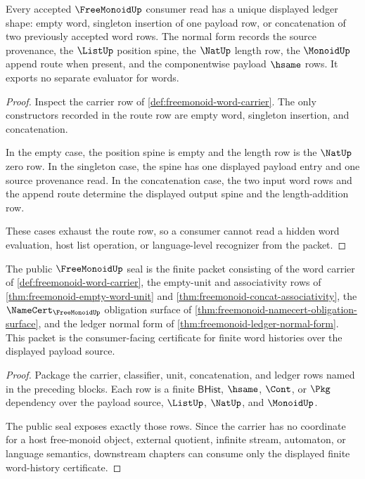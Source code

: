 \begin{theorem}
\label{thm:freemonoid-ledger-normal-form}
Every accepted $\FreeMonoidUp$ consumer read has a unique displayed ledger
shape: empty word, singleton insertion of one payload row, or concatenation of
two previously accepted word rows. The normal form records the source
provenance, the $\ListUp$ position spine, the $\NatUp$ length row, the
$\MonoidUp$ append route when present, and the componentwise payload
$\hsame$ rows. It exports no separate evaluator for words.
\end{theorem}
\begin{proof}
Inspect the carrier row of
\autoref{def:freemonoid-word-carrier}. The only constructors recorded in the
route row are empty word, singleton insertion, and concatenation.

In the empty case, the position spine is empty and the length row is the
$\NatUp$ zero row. In the singleton case, the spine has one displayed payload
entry and one source provenance read. In the concatenation case, the two input
word rows and the append route determine the displayed output spine and the
length-addition row.

These cases exhaust the route row, so a consumer cannot read a hidden word
evaluation, host list operation, or language-level recognizer from the packet.
\end{proof}

\begin{theorem}
\label{thm:freemonoid-public-seal}
The public $\FreeMonoidUp$ seal is the finite packet consisting of the word
carrier of \autoref{def:freemonoid-word-carrier}, the empty-unit and
associativity rows of \autoref{thm:freemonoid-empty-word-unit} and
\autoref{thm:freemonoid-concat-associativity}, the
$\NameCert_{\FreeMonoidUp}$ obligation surface of
\autoref{thm:freemonoid-namecert-obligation-surface}, and the ledger normal
form of \autoref{thm:freemonoid-ledger-normal-form}. This packet is the
consumer-facing certificate for finite word histories over the displayed
payload source.
\end{theorem}
\begin{proof}
Package the carrier, classifier, unit, concatenation, and ledger rows named in
the preceding blocks. Each row is a finite $\mathsf{BHist}$, $\hsame$, $\Cont$,
or $\Pkg$ dependency over the payload source, $\ListUp$, $\NatUp$, and
$\MonoidUp$.

The public seal exposes exactly those rows. Since the carrier has no coordinate
for a host free-monoid object, external quotient, infinite stream, automaton, or
language semantics, downstream chapters can consume only the displayed finite
word-history certificate.
\end{proof}

